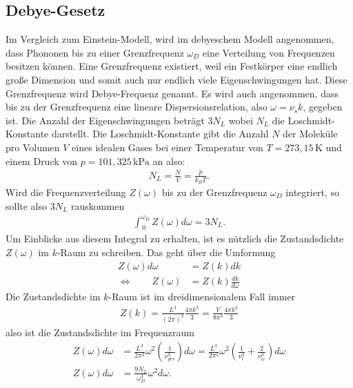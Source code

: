 \subsection{Debye-Gesetz}
\label{sec:debye}

Im Vergleich zum Einstein-Modell, wird im debyeschem Modell angenommen, dass Phononen bis zu einer Grenzfrequenz $\omega_D$ eine Verteilung von Frequenzen besitzen können. 
Eine Grenzfrequenz existiert, weil ein Festkörper eine endlich große Dimension und somit auch nur endlich viele Eigenschwingungen hat. Diese Grenzfrequenz wird Debye-Frequenz genannt. Es wird auch angenommen, 
dass bis zu der Grenzfrequenz eine lineare Dispersionsrelation, also $\omega = \nu_s k$, gegeben ist. 
Die Anzahl der Eigenschwingungen beträgt $3 N_L$ wobei $N_L$ die Loschmidt-Konstante darstellt. Die Loschmidt-Konstante gibt die Anzahl $N$ der Moleküle pro Volumen $V$ eines idealen Gases 
bei einer Temperatur von $T = 273, \! 15\, \si{\kelvin}$ und einem Druck von $p = 101, \! 325 \, \si{\kilo\pascal}$ an also:
\begin{align}
    N_L = \frac{N}{V} = \frac{p}{k_B T}.
\end{align}
Wird die Frequenzverteilung $Z(\omega)$ bis zu der Grenzfrequenz $\omega_D$ integriert, so sollte also $3 N_L$ rauskommen
\begin{align}
    \label{eqn:Z_integral}
    \int_{\, 0}^{\omega_D} Z(\omega) d\omega = 3 N_L .
\end{align}
Um Einblicke aus diesem Integral zu erhalten, ist es nützlich die Zustandsdichte $Z(\omega)$ im $k$-Raum zu schreiben. Das geht über die Umformung 
\begin{align}
    Z(\omega) d\omega &= Z(k) d k\\
    \Leftrightarrow \, \, \, \, \, \, \, \, \, \, \, \, Z(\omega) &= Z(k) \frac{d k}{d\omega}
\end{align}
Die Zustandsdichte im $k$-Raum ist im dreidimensionalem Fall immer 
\begin{align}
    Z(k) = \frac{L^3}{\left(2 \pi\right)^3} \frac{4 \pi k^3}{3} = \frac{V}{8 \pi^3} \frac{4 \pi k^3}{3}
\end{align}
also ist die Zustandsdichte im Frequenzraum
\begin{align}
    \label{eqn:Z}
    Z(\omega) d \omega &= \frac{L^3}{2 \pi^2} \omega^2 \left(\frac{1}{\nu^3_{ges}} \right) d\omega= \frac{L^3}{2 \pi^2} \omega^2 \left(\frac{1}{\nu^3_l} + \frac{2}{\nu^3_{tr}}\right) d\omega \\
    Z(\omega) d \omega &= \frac{9 N_L}{\omega_D^3} \omega^2 d \omega.
\end{align}

